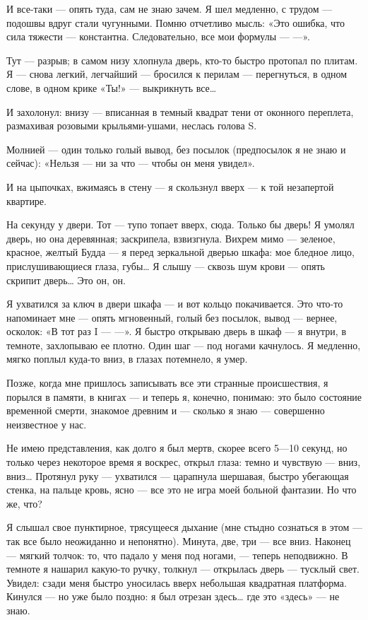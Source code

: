 \documentclass[11pt,openany]{book}
\begin{document}
И все-таки --- опять туда, сам не знаю зачем. Я шел медленно, с трудом --- подошвы вдруг стали чугунными. Помню отчетливо мысль: «Это ошибка, что сила тяжести --- константна. Следовательно, все мои формулы --- ---».

Тут --- разрыв; в самом низу хлопнула дверь, кто-то быстро протопал по плитам. Я --- снова легкий, легчайший --- бросился к перилам --- перегнуться, в одном слове, в одном крике «Ты!» --- выкрикнуть все\ldots{}

И захолонул: внизу --- вписанная в темный квадрат тени от оконного переплета, размахивая розовыми крыльями-ушами, неслась голова S.

Молнией --- один только голый вывод, без посылок (предпосылок я не знаю и сейчас): «Нельзя --- ни за что --- чтобы он меня увидел».

И на цыпочках, вжимаясь в стену --- я скользнул вверх --- к той незапертой квартире.

На секунду у двери. Тот --- тупо топает вверх, сюда. Только бы дверь! Я умолял дверь, но она деревянная; заскрипела, взвизгнула. Вихрем мимо --- зеленое, красное, желтый Будда --- я перед зеркальной дверью шкафа: мое бледное лицо, прислушивающиеся глаза, губы\ldots{} Я слышу --- сквозь шум крови --- опять скрипит дверь\ldots{} Это он, он.

Я ухватился за ключ в двери шкафа --- и вот кольцо покачивается. Это что-то напоминает мне --- опять мгновенный, голый без посылок, вывод --- вернее, осколок: «В тот раз I --- ---». Я быстро открываю дверь в шкаф --- я внутри, в темноте, захлопываю ее плотно. Один шаг --- под ногами качнулось. Я медленно, мягко поплыл куда-то вниз, в глазах потемнело, я умер.

Позже, когда мне пришлось записывать все эти странные происшествия, я порылся в памяти, в книгах --- и теперь я, конечно, понимаю: это было состояние временной смерти, знакомое древним и --- сколько я знаю --- совершенно неизвестное у нас.

Не имею представления, как долго я был мертв, скорее всего 5---10 секунд, но только через некоторое время я воскрес, открыл глаза: темно и чувствую --- вниз, вниз\ldots{} Протянул руку --- ухватился --- царапнула шершавая, быстро убегающая стенка, на пальце кровь, ясно --- все это не игра моей больной фантазии. Но что же, что?

Я слышал свое пунктирное, трясущееся дыхание (мне стыдно сознаться в этом --- так все было неожиданно и непонятно). Минута, две, три --- все вниз. Наконец --- мягкий толчок: то, что падало у меня под ногами, --- теперь неподвижно. В темноте я нашарил какую-то ручку, толкнул --- открылась дверь --- тусклый свет. Увидел: сзади меня быстро уносилась вверх небольшая квадратная платформа. Кинулся --- но уже было поздно: я был отрезан здесь\ldots{} где это «здесь» --- не знаю.
\end{document}

